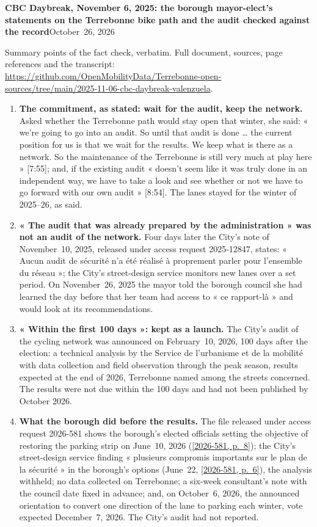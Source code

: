 \documentclass[10pt,letterpaper]{article}
\newcommand{\repourl}{https://github.com/OpenMobilityData/Terrebonne-open-sources}
\newcommand{\pagesurl}{https://openmobilitydata.github.io/Terrebonne-access-requests}
\newcommand{\cliptime}[1]{\textsf{\small[#1]}}
\newcommand{\pgl}[2]{\href{\pagesurl/2026-581/raw/01_emails_mandate_counts.pdf\#page=#1}{\textsf{\small[2026-581, p.~#2]}}}
\newcommand{\pg}[1]{\pgl{#1}{#1}}
\begin{document}
{\large\bfseries CBC Daybreak, November 6, 2025: the borough mayor-elect's statements on the Terrebonne bike path and the audit checked against the record}\hfill{\small October~26, 2026}

\vspace{-0.2em}
{\small Summary points of the fact check, verbatim. Full document, sources, page references and the transcript:\\ \href{\repourl/tree/main/2025-11-06-cbc-daybreak-valenzuela}{\repourl/tree/main/2025-11-06-cbc-daybreak-valenzuela}.}
\vspace{0.4em}

\begin{enumerate}[nosep,itemsep=0.3em,leftmargin=1.4em]
\item \textbf{The commitment, as stated: wait for the audit, keep the network.} Asked whether the Terrebonne path would stay open that winter, she said: « we're going to go into an audit. So until that audit is done … the current position for us is that we wait for the results. We keep what is there as a network. So the maintenance of the Terrebonne is still very much at play here » \cliptime{7:55}; and, if the existing audit « doesn't seem like it was truly done in an independent way, we have to take a look and see whether or not we have to go forward with our own audit » \cliptime{8:54}. The lanes stayed for the winter of 2025--26, as said.
\item \textbf{« The audit that was already prepared by the administration » was not an audit of the network.} Four days later the City's note of November~10, 2025, released under access request 2025-12847, states: « Aucun audit de sécurité n'a été réalisé à proprement parler pour l'ensemble du réseau »; the City's street-design service monitors new lanes over a set period. On November~26, 2025 the mayor told the borough council she had learned the day before that her team had access to « ce rapport-là » and would look at its recommendations.
\item \textbf{« Within the first 100 days »: kept as a launch.} The City's audit of the cycling network was announced on February~10, 2026, 100 days after the election: a technical analysis by the Service de l'urbanisme et de la mobilité with data collection and field observation through the peak season, results expected at the end of 2026, Terrebonne named among the streets concerned. The results were not due within the 100 days and had not been published by October 2026.
\item \textbf{What the borough did before the results.} The file released under access request 2026-581 shows the borough's elected officials setting the objective of restoring the parking strip on June~10, 2026 (\pg{8}); the City's street-design service finding « plusieurs compromis importants sur le plan de la sécurité » in the borough's options (June~22, \pg{6}), the analysis withheld; no data collected on Terrebonne; a six-week consultant's note with the council date fixed in advance; and, on October~6, 2026, the announced orientation to convert one direction of the lane to parking each winter, vote expected December~7, 2026. The City's audit had not reported.

\end{enumerate}
\end{document}
